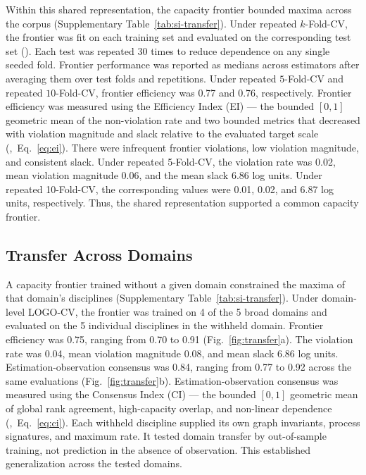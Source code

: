 \documentclass{article}
\begin{document}
Within this shared representation, the capacity frontier bounded maxima across the corpus (Supplementary Table~\ref{tab:si-transfer}). Under repeated $k$-Fold-CV, the frontier was fit on each training set and evaluated on the corresponding test set (). Each test was repeated 30 times to reduce dependence on any single seeded fold. Frontier performance was reported as medians across estimators after averaging them over test folds and repetitions. Under repeated $5$-Fold-CV and repeated $10$-Fold-CV, frontier efficiency was 0.77 and 0.76, respectively. Frontier efficiency was measured using the Efficiency Index (EI) --- the bounded $[0, 1]$ geometric mean of the non-violation rate and two bounded metrics that decreased with violation magnitude and slack relative to the evaluated target scale (,~Eq.~\eqref{eq:ei}). There were infrequent frontier violations, low violation magnitude, and consistent slack. Under repeated 5-Fold-CV, the violation rate was 0.02, mean violation magnitude 0.06, and the mean slack 6.86 log units. Under repeated 10-Fold-CV, the corresponding values were 0.01, 0.02, and 6.87 log units, respectively. 
Thus, the shared representation supported a common capacity frontier.

\subsection*{Transfer Across Domains}
\label{sub-sec:transfer}
A capacity frontier trained without a given domain constrained the maxima of that domain’s disciplines (Supplementary Table~\ref{tab:si-transfer}). Under domain-level LOGO-CV, the frontier was trained on 4 of the 5 broad domains and evaluated on the 5 individual disciplines in the withheld domain. Frontier efficiency was 0.75, ranging from 0.70 to 0.91 (Fig.~\ref{fig:transfer}a). The violation rate was 0.04, mean violation magnitude 0.08, and mean slack 6.86 log units. Estimation-observation consensus was 0.84, ranging from 0.77 to 0.92 across the same evaluations (Fig.~\ref{fig:transfer}b). Estimation-observation consensus was measured using the Consensus Index (CI) --- the bounded $[0, 1]$ geometric mean of global rank agreement, high-capacity overlap, and non-linear dependence (,~Eq.~\eqref{eq:ci}). Each withheld discipline supplied its own graph invariants, process signatures, and maximum rate. It tested domain transfer by out-of-sample training, not prediction in the absence of observation. This established generalization across the tested domains.
\end{document}
